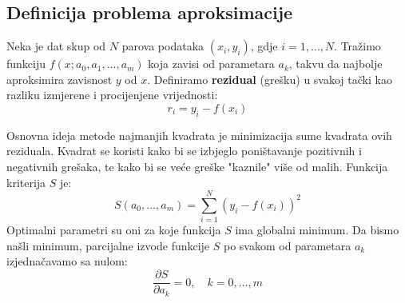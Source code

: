 \documentclass[12pt, a4paper]{article}
\begin{document}
\subsection{Definicija problema aproksimacije}
Neka je dat skup od $N$ parova podataka $(x_i, y_i)$, gdje $i=1, \dots, N$. Tražimo funkciju $f(x; a_0, a_1, \dots, a_m)$ koja zavisi od parametara $a_k$, takvu da najbolje aproksimira zavisnost $y$ od $x$.
Definiramo \textbf{rezidual} (grešku) u svakoj tački kao razliku izmjerene i procijenjene vrijednosti:
\begin{equation}
    r_i = y_i - f(x_i)
\end{equation}

Osnovna ideja metode najmanjih kvadrata je minimizacija sume kvadrata ovih reziduala. Kvadrat se koristi kako bi se izbjeglo poništavanje pozitivnih i negativnih grešaka, te kako bi se veće greške "kaznile" više od malih. Funkcija kriterija $S$ je:
\begin{equation}
    S(a_0, \dots, a_m) = \sum_{i=1}^{N} (y_i - f(x_i))^2
\end{equation}
Optimalni parametri su oni za koje funkcija $S$ ima globalni minimum. Da bismo našli minimum, parcijalne izvode funkcije $S$ po svakom od parametara $a_k$ izjednačavamo sa nulom:
\begin{equation}
    \frac{\partial S}{\partial a_k} = 0, \quad k=0, \dots, m
\end{equation}
\end{document}
